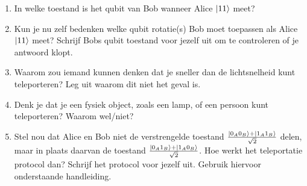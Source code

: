 \documentclass[../../main.tex]{subfiles}
\begin{document}
\begin{antwoord}
\end{antwoord}
\begin{opdracht}
\begin{enumerate}
\item In welke toestand is het qubit van Bob wanneer Alice $\ket{11}$ meet?
\item Kun je nu zelf bedenken welke qubit rotatie(s) Bob moet toepassen als Alice $\ket{11}$ meet? Schrijf Bobs qubit toestand voor jezelf uit om te controleren of je antwoord klopt.

\item Waarom zou iemand kunnen denken dat je sneller dan de lichtsnelheid kunt teleporteren? Leg uit waarom dit niet het geval is.

\item Denk je dat je een fysiek object, zoals een lamp, of een persoon kunt teleporteren? Waarom wel/niet?


\item Stel nou dat Alice en Bob niet de verstrengelde toestand $\frac{\ket{0_A0_B}+\ket{1_A1_B}}{\sqrt{2}}$ delen, maar in plaats daarvan de toestand $\frac{\ket{0_A1_B}+\ket{1_A0_B}}{\sqrt{2}}$. Hoe werkt het teleportatie protocol dan? Schrijf het protocol voor jezelf uit. Gebruik hiervoor onderstaande handleiding.
\end{enumerate}
\end{opdracht}
\end{document}
